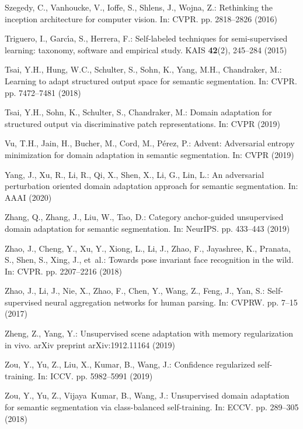 \documentclass[runningheads]{llncs}
\begin{document}
\begin{thebibliography}{10}
Szegedy, C., Vanhoucke, V., Ioffe, S., Shlens, J., Wojna, Z.: Rethinking the
  inception architecture for computer vision. In: CVPR. pp. 2818--2826 (2016)

Triguero, I., Garc{\'\i}a, S., Herrera, F.: Self-labeled techniques for
  semi-supervised learning: taxonomy, software and empirical study. KAIS
  \textbf{42}(2),  245--284 (2015)

Tsai, Y.H., Hung, W.C., Schulter, S., Sohn, K., Yang, M.H., Chandraker, M.:
  Learning to adapt structured output space for semantic segmentation. In:
  CVPR. pp. 7472--7481 (2018)

Tsai, Y.H., Sohn, K., Schulter, S., Chandraker, M.: Domain adaptation for
  structured output via discriminative patch representations. In: CVPR (2019)

Vu, T.H., Jain, H., Bucher, M., Cord, M., P{\'e}rez, P.: Advent: Adversarial
  entropy minimization for domain adaptation in semantic segmentation. In: CVPR
  (2019)

Yang, J., Xu, R., Li, R., Qi, X., Shen, X., Li, G., Lin, L.: An adversarial
  perturbation oriented domain adaptation approach for semantic segmentation.
  In: AAAI (2020)

Zhang, Q., Zhang, J., Liu, W., Tao, D.: Category anchor-guided unsupervised
  domain adaptation for semantic segmentation. In: NeurIPS. pp. 433--443 (2019)

Zhao, J., Cheng, Y., Xu, Y., Xiong, L., Li, J., Zhao, F., Jayashree, K.,
  Pranata, S., Shen, S., Xing, J., et~al.: Towards pose invariant face
  recognition in the wild. In: CVPR. pp. 2207--2216 (2018)

Zhao, J., Li, J., Nie, X., Zhao, F., Chen, Y., Wang, Z., Feng, J., Yan, S.:
  Self-supervised neural aggregation networks for human parsing. In: CVPRW. pp.
  7--15 (2017)

Zheng, Z., Yang, Y.: Unsupervised scene adaptation with memory regularization
  in vivo. arXiv preprint arXiv:1912.11164  (2019)

Zou, Y., Yu, Z., Liu, X., Kumar, B., Wang, J.: Confidence regularized
  self-training. In: ICCV. pp. 5982--5991 (2019)

Zou, Y., Yu, Z., Vijaya~Kumar, B., Wang, J.: Unsupervised domain adaptation for
  semantic segmentation via class-balanced self-training. In: ECCV. pp.
  289--305 (2018)

\end{thebibliography}
 

\end{document}
